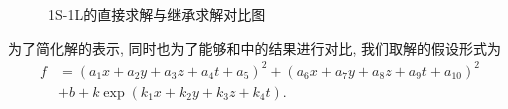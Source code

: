 \begin{figure}[ht]
\centering
{}
\hspace{1.5cm}
\caption{1S-1L的直接求解与继承求解对比图} \label{sb1}
\end{figure}

为了简化解的表示, 同时也为了能够和中的结果进行对比, 我们取解的假设形式为
\begin{equation}
\begin{aligned}
    f&=(a_1 x+a_2 y+a_3 z+ a_4 t +a_5)^2+(a_6 x+a_7 y+a_8 z+ a_9 t +a_{10})^2 \\
    &+b+k \exp(k_1 x + k_2 y +k_3 z+ k_4 t).
\end{aligned}
\end{equation}

